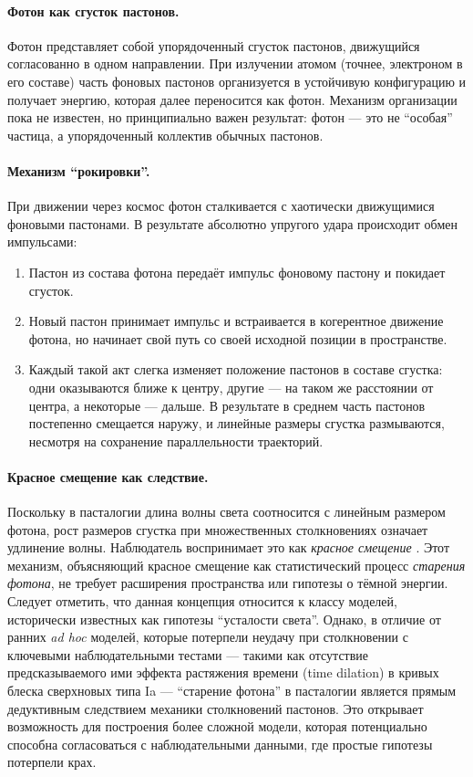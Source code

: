\documentclass[pdflatex,sn-mathphys-num]{sn-jnl}
\begin{document}
\paragraph{Фотон как сгусток пастонов.} 
Фотон представляет собой упорядоченный сгусток пастонов, движущийся согласованно в одном направлении. При излучении атомом (точнее, электроном в его составе) часть фоновых пастонов организуется в устойчивую конфигурацию и получает энергию, которая далее переносится как фотон. Механизм организации пока не известен, но принципиально важен результат: фотон — это не ``особая'' частица, а упорядоченный коллектив обычных пастонов.

\paragraph{Механизм ``рокировки''.}
При движении через космос фотон сталкивается с хаотически движущимися фоновыми пастонами. В результате абсолютно упругого удара происходит обмен импульсами: 
\begin{enumerate}
  \item Пастон из состава фотона передаёт импульс фоновому пастону и покидает сгусток.
  \item Новый пастон принимает импульс и встраивается в когерентное движение фотона, но начинает свой путь со своей исходной позиции в пространстве.
  \item Каждый такой акт слегка изменяет положение пастонов в составе сгустка: одни оказываются ближе к центру, другие — на таком же расстоянии от центра, а некоторые — дальше. В результате в среднем часть пастонов постепенно смещается наружу, и линейные размеры сгустка размываются, несмотря на сохранение параллельности траекторий.
\end{enumerate}

\paragraph{Красное смещение как следствие.}
Поскольку в пасталогии длина волны света соотносится с линейным размером фотона, рост размеров сгустка при множественных столкновениях означает удлинение волны. Наблюдатель воспринимает это как \emph{красное смещение} \cite{hubble1929}. Этот механизм, объясняющий красное смещение как статистический процесс \emph{старения фотона}, не требует расширения пространства или гипотезы о тёмной энергии. Следует отметить, что данная концепция относится к классу моделей, исторически известных как гипотезы ``усталости света''. Однако, в отличие от ранних \textit{ad hoc} моделей, которые потерпели неудачу при столкновении с ключевыми наблюдательными тестами --- такими как отсутствие предсказываемого ими эффекта растяжения времени (time dilation) в кривых блеска сверхновых типа Ia \cite{goldhaber2001-dilation} --- ``старение фотона'' в пасталогии является прямым дедуктивным следствием механики столкновений пастонов. Это открывает возможность для построения более сложной модели, которая потенциально способна согласоваться с наблюдательными данными, где простые гипотезы потерпели крах.
\end{document}
